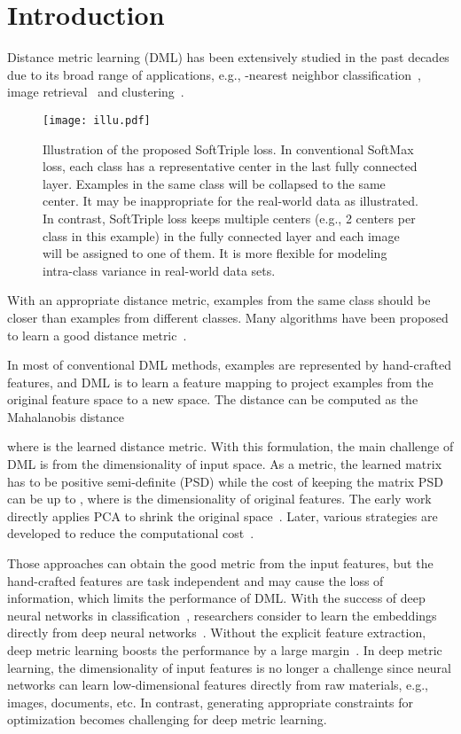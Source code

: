\documentclass[10pt,twocolumn,letterpaper]{article}
\begin{document}
\section{Introduction}
Distance metric learning (DML) has been extensively studied in the past decades due to its broad range of applications, e.g., -nearest neighbor classification~\cite{WeinbergerS09}, image retrieval~\cite{SongXJS16} and clustering~\cite{XingNJR02}. 
\begin{figure}[!ht]
\centering
\texttt{[image: illu.pdf]}
\caption{Illustration of the proposed SoftTriple loss. In conventional SoftMax loss, each class has a representative center in the last fully connected layer. Examples in the same class will be collapsed to the same center. It may be inappropriate for the real-world data as illustrated. In contrast, SoftTriple loss keeps multiple centers (e.g., 2 centers per class in this example) in the fully connected layer and each image will be assigned to one of them. It is more flexible for modeling intra-class variance in real-world data sets.\label{fig:illu}}
\end{figure}
With an appropriate distance metric, examples from the same class should be closer than examples from different classes. Many algorithms have been proposed to learn a good distance metric~\cite{ParkhiVZ15,QianJY0Z15,SchroffKP15,WeinbergerS09}.

In most of conventional DML methods, examples are represented by hand-crafted features, and DML is to learn a feature mapping to project examples from the original feature space to a new space. The distance can be computed as the Mahalanobis distance~\cite{mahalanobis1936generalized}

where  is the learned distance metric. With this formulation, the main challenge of DML is from the dimensionality of input space. As a metric, the learned matrix  has to be positive semi-definite (PSD) while the cost of keeping the matrix PSD can be up to , where  is the dimensionality of original features. The early work directly applies PCA to shrink the original space~\cite{WeinbergerS09}. Later, various strategies are developed to reduce the computational cost~\cite{QianJY0Z15,QianJZL15}.

Those approaches can obtain the good metric from the input features, but the hand-crafted features are task independent and may cause the loss of information, which limits the performance of DML. With the success of deep neural networks in classification~\cite{KrizhevskySH12}, researchers consider to learn the embeddings directly from deep neural networks~\cite{ParkhiVZ15,SchroffKP15}. Without the explicit feature extraction, deep metric learning boosts the performance by a large margin~\cite{SchroffKP15}. In deep metric learning, the dimensionality of input features is no longer a challenge since neural networks can learn low-dimensional features directly from raw materials, e.g., images, documents, etc. In contrast, generating appropriate constraints for optimization becomes challenging for deep metric learning.
\end{document}
